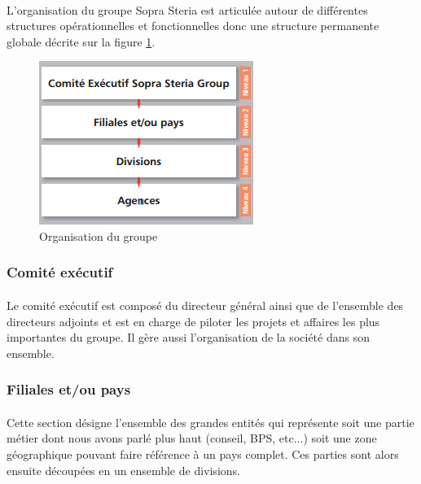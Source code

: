 \paragraph{}
L'organisation du groupe Sopra Steria est articulée autour de différentes structures opérationnelles et fonctionnelles donc une structure permanente globale décrite sur la figure \ref{sopraSteriaOrganisation}.

\begin{figure}[h]
	\includegraphics[scale=0.8]{images/sopraSteriaOrganisation.png}
	\centering
	\caption{Organisation du groupe}
	\label{sopraSteriaOrganisation}
\end{figure}
		
\subsubsection{Comité exécutif}
\paragraph{}
Le comité exécutif est composé du directeur général ainsi que de l'ensemble des directeurs adjoints et est en charge de piloter les projets et affaires les plus importantes du groupe. Il gère aussi l'organisation de la société dans son ensemble.

\subsubsection{Filiales et/ou pays}
\paragraph{}
Cette section désigne l'ensemble des grandes entités qui représente soit une partie métier dont nous avons parlé plus haut (conseil, BPS, etc...) soit une zone géographique pouvant faire référence à un pays complet. Ces parties sont alors ensuite découpées en un ensemble de divisions.


